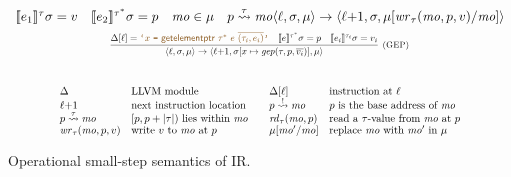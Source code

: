 \begin{figure}
\[\begin{array}{cl}
{  \evalexprty{e_1}{\localstore}{\tau} = v \quad
  \evalexprty{e_2}{\localstore}{\pointertypeof{\tau}} = p \quad
  \mo \in \memory \quad
  \isinbounds{p}{\tau}{\mo}
}
{
  \progstate{\location}{\localstore}{\stack}{\memory}
  \step
  \progstate{\nextinstr{\location}}{\localstore}{\stack}{\heapreplace{\memory}{\mo}{\mowrite{\tau}{\mo}{p}{v}}}
}
\\[5pt]
\ruledefsmall{GEP}{
  \instrat{\location} = \codequote{x~\texttt{=}~\tgep~\pointertypeof{\tau}~e~\overline{(\tau_i, e_i)}} \quad
  \evalexprty{e}{\localstore}{\pointertypeof{\tau}} = p \quad
  \evalexprty{e_i}{\localstore}{\tau_i} = v_i
}
{
  \progstate{\location}{\localstore}{\stack}{\memory}
  \step
  \progstate{\nextinstr{\location}}
    {\localstore[x \mapsto \evalgep(\tau, p, \overline{v_i})]}
    {\stack}{\memory}
}
\\[2em]
\scalebox{0.8}{$
\begin{array}{@{}l@{\quad}l@{\qquad}l@{\quad}l@{}}
\module & \text{\llvm module} &
\instrat{\location} & \text{instruction at $\location$}
\\[-1pt]
\nextinstr{\location} & \text{next instruction location} &
\isbaseaddr{p}{\mo} & \text{$p$ is the base address of $\mo$}
\\[-1pt]
\isinbounds{p}{\tau}{\mo} & \text{$[p,p+\sizeof{\tau})$ lies within $\mo$} &
\moread{\tau}{\mo}{p} & \text{read a $\tau$-value from $\mo$ at $p$}
\\[-1pt]
\mowrite{\tau}{\mo}{p}{v} & \text{write $v$ to $\mo$ at $p$} &
\heapreplace{\memory}{\mo}{\mo'} & \text{replace $\mo$ with $\mo'$ in $\memory$}
\\[-1pt]
\end{array}
$}
\end{array}
\]
\caption{Operational small-step semantics of \llvm IR.}
\label{figure:llvm-semantics}
\end{figure}
